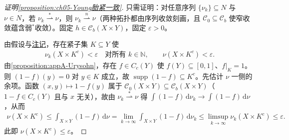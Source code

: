 \documentclass[../../main.tex]{subfiles}%
\begin{document}
\begin{proof}[证明\cref{proposition:ch05-Young胎紧一致}]
只需证明：对任意序列 $\{\nu_k\}\subseteq N$ 与 $\nu\in N$，若 $\nu_k\stackrel{*}{\rightharpoonup}\nu$，则 $\nu_k\stackrel{n}{\rightharpoonup}\nu$（两种拓扑都由序列收敛刻画，且 $\mathcal{C}_0\subseteq\mathcal{C}_b$ 使窄收敛蕴含弱$^*$收敛）。固定 $h\in\mathcal{C}_b(X\times Y)$，固定 $\varepsilon>0$。

由假设与\hyperref[remark:ch05-Young胎紧投影]{注记}，存在紧子集 $K\subseteq Y$ 使
\begin{align*}
\nu_k(X\times K^c)<\varepsilon\quad\text{对所有 }k\in\mathbb{N},
\qquad
\nu(X\times K^c)<\varepsilon.
\end{align*}
由\cref{proposition:appA-Urysohn}，存在 $f\in C_c(Y)$ 使 $f(Y)\subseteq[0,1]$、$f|_K=1$。则 $(1-f)(y)=0$ 对 $y\in K$ 成立，故 $\operatorname{supp}(1-f)\subseteq K^c$。先估计 $\nu$ 一侧的余项。函数 $(x,y)\mapsto1-f(y)$ 属于 $\mathcal{C}_0(X\times Y)\subseteq\mathcal{C}_b(X\times Y)$（$1-f\in C_c(Y)$ 且与 $x$ 无关），故由 $\nu_k\stackrel{*}{\rightharpoonup}\nu$ 得 $\int(1-f)\,\mathrm{d}\nu_k\to\int(1-f)\,\mathrm{d}\nu$，从而
\begin{align*}
\nu(X\times K^c)\leqslant\int_{X\times Y}(1-f)\,\mathrm{d}\nu
=\lim_{k\to\infty}\int_{X\times Y}(1-f)\,\mathrm{d}\nu_k
\leqslant\limsup_{k\to\infty}\nu_k(X\times K^c)\leqslant\varepsilon.
\end{align*}
此即 $\nu(X\times K^c)\leqslant\varepsilon$。


\end{proof}
\end{document}
